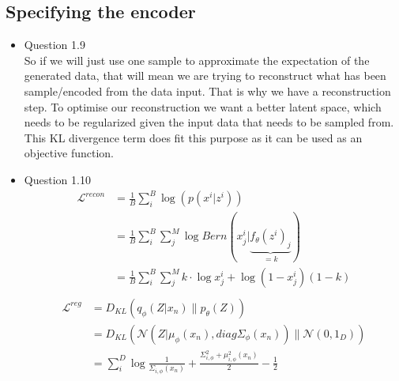 \documentclass{article}
\begin{document}
  \subsection{Specifying the encoder}
    \begin{itemize}
      \item Question 1.9 \\
      So if we will just use one sample to approximate the expectation of the generated data, that will mean we are trying to reconstruct what has been sample/encoded from the data input. That is why we have a reconstruction step. To optimise our reconstruction we want a better latent space, which needs to be regularized given the input data that needs to be sampled from. This KL divergence term does fit this purpose as it can be used as an objective function. 
      \item Question 1.10 \\
      \begin{align*}
        \mathcal{L}^{recon} &= \frac{1}{B} \sum_{i}^{B} \log \left(p(x^i| z^i)\right) \\
        &= \frac{1}{B} \sum_{i}^{B}\sum_{j}^{M} \log Bern\left(x_{j}^{i}| \underbrace{f_{\theta}(z^i)_{j}}_{=k}\right) \\
        &=\frac{1}{B} \sum_{i}^{B}\sum_{j}^{M} k \cdot\log x_{j}^{i} + \log \left( 1 - x_{j}^{i}\right)(1 - k) \\
      \end{align*}
      \begin{align*}
        \mathcal{L}^{reg} &= D_{KL}(q_{\phi}(Z| x_n) \| p_{\theta}(Z)) \\
        &= D_{KL}\left(\mathcal{N}(Z | \mu_{\phi}(x_n), diag\Sigma_{\phi}(x_n)) \| \mathcal{N}(0, \mathrm{1}_D)\right) \\
        &= \sum_{i}^{D} \log \frac{1}{\Sigma_{i, \phi}(x_n)} + \frac{\Sigma_{i, \phi}^{2} + \mu_{i, \phi}^{2}(x_n)}{2} - \frac{1}{2}
      \end{align*}
    \end{itemize}
\end{document}

